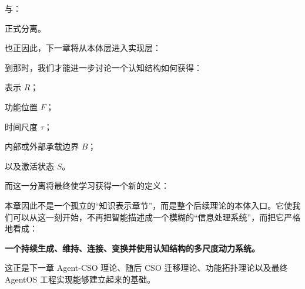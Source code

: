 与：

\begin{statementbox}
\centering
{}
\end{statementbox}

正式分离。

也正因此，下一章将从本体层进入实现层：

\begin{statementbox}
\centering
{}
\end{statementbox}

到那时，我们才能进一步讨论一个认知结构如何获得：

表示 \(R\)；

功能位置 \(F\)；

时间尺度 \(\tau\)；

内部或外部承载边界 \(B\)；

以及激活状态 \(S\)。

而这一分离将最终使学习获得一个新的定义：

\begin{statementbox}
\centering
{}
\end{statementbox}

本章因此不是一个孤立的“知识表示章节”，而是整个后续理论的本体入口。它使我们可以从这一刻开始，不再把智能描述成一个模糊的“信息处理系统”，而把它严格地看成：

\begin{statementbox}
\bfseries
一个持续生成、维持、连接、变换并使用认知结构的多尺度动力系统。
\end{statementbox}

这正是下一章 Agent-CSO 理论、随后 CSO 迁移理论、功能拓扑理论以及最终 AgentOS 工程实现能够建立起来的基础。
